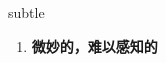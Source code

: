 
\begin{frame}
{\huge subtle}
\begin{center}
\begin{enumerate}\Large
  \item \textbf{微妙的，难以感知的}
\end{enumerate}
\end{center}
\end{frame}

